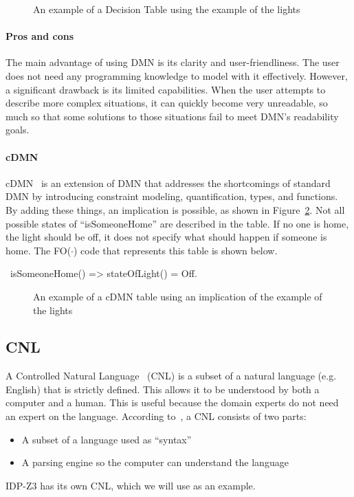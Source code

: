 \documentclass[11pt,a4paper]{report}
\newcommand{\fodot}{FO($\cdot$)\xspace}
\begin{document}
\begin{figure}
    \centering
    \caption{An example of a Decision Table using the example of the lights}
    \label{fig:DT}
\end{figure}

\paragraph{ Pros and cons}
The main advantage of using DMN is its clarity and user-friendliness. The user does not need any programming knowledge to model with it effectively. However, a significant drawback is its limited capabilities. When the user attempts to describe more complex situations, it can quickly become very unreadable, so much so that some solutions to those situations fail to meet DMN's readability goals.
 
\paragraph{cDMN}
cDMN~\cite{cDMN} is an extension of DMN that addresses the shortcomings of standard DMN by introducing constraint modeling, quantification, types, and functions. By adding these things, an implication is possible, as shown in Figure~\ref{fig:cDMNTable}. Not all possible states of ``isSomeoneHome'' are described in the table. If no one is home, the light should be off, it does not specify what should happen if someone is home. The \fodot code that represents this table is shown below.
 
\begin{idplisting}
~isSomeoneHome() => stateOfLight() = Off.
\end{idplisting}

\begin{figure}
    \centering
    \caption{An example of a cDMN table using an implication of the example of the lights}
    \label{fig:cDMNTable}
\end{figure}
 
\subsection{CNL}
\label{CNL}
A Controlled Natural Language~\cite{CNL} (CNL) is a subset of a natural language (e.g. English) that is strictly defined. This allows it to be understood by both a computer and a human. This is useful because the domain experts do not need an expert on the language. According to~\cite{CNLAttemptoControlledEnglish}, a CNL consists of two parts:
 \begin{itemize}
 	\item A subset of a language used as ``syntax'' 
     \item A parsing engine so the computer can understand the language
 \end{itemize}
 IDP-Z3 has its own CNL, which we will use as an example.
\end{document}
